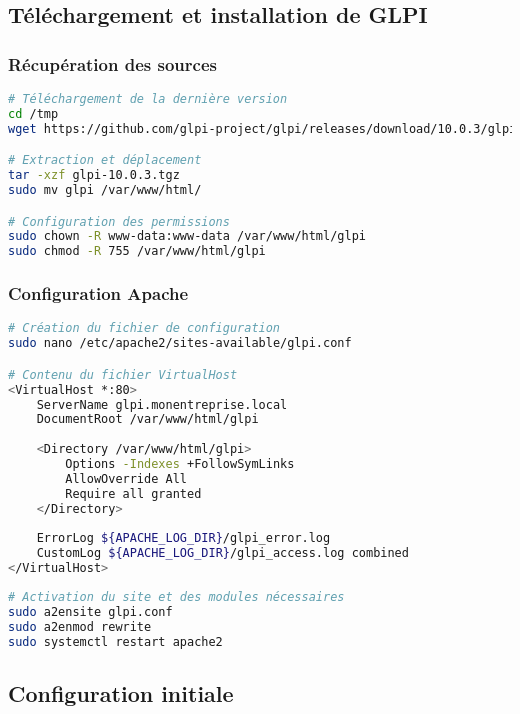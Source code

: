 \documentclass[12pt,a4paper]{article}
\begin{document}
\subsection{Téléchargement et installation de GLPI}

\subsubsection{Récupération des sources}
\begin{lstlisting}[language=bash, caption=Téléchargement de GLPI]
# Téléchargement de la dernière version
cd /tmp
wget https://github.com/glpi-project/glpi/releases/download/10.0.3/glpi-10.0.3.tgz

# Extraction et déplacement
tar -xzf glpi-10.0.3.tgz
sudo mv glpi /var/www/html/

# Configuration des permissions
sudo chown -R www-data:www-data /var/www/html/glpi
sudo chmod -R 755 /var/www/html/glpi
\end{lstlisting}

\subsubsection{Configuration Apache}
\begin{lstlisting}[language=bash, caption=Configuration du VirtualHost]
# Création du fichier de configuration
sudo nano /etc/apache2/sites-available/glpi.conf

# Contenu du fichier VirtualHost
<VirtualHost *:80>
    ServerName glpi.monentreprise.local
    DocumentRoot /var/www/html/glpi
    
    <Directory /var/www/html/glpi>
        Options -Indexes +FollowSymLinks
        AllowOverride All
        Require all granted
    </Directory>
    
    ErrorLog ${APACHE_LOG_DIR}/glpi_error.log
    CustomLog ${APACHE_LOG_DIR}/glpi_access.log combined
</VirtualHost>
\end{lstlisting}

\begin{lstlisting}[language=bash, caption=Activation du site]
# Activation du site et des modules nécessaires
sudo a2ensite glpi.conf
sudo a2enmod rewrite
sudo systemctl restart apache2
\end{lstlisting}

\subsection{Configuration initiale}
\end{document}
